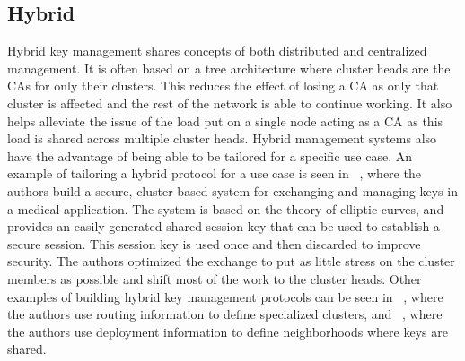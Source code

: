 \documentclass[journal]{IEEEtran}
\begin{document}
\subsection{Hybrid}
Hybrid key management shares concepts of both distributed and centralized management. It is often based on a tree architecture where cluster heads are the CAs for only their clusters. This reduces the effect of losing a CA as only that cluster is affected and the rest of the network is able to continue working. It also helps alleviate the issue of the load put on a single node acting as a CA as this load is shared across multiple cluster heads. Hybrid management systems also have the advantage of being able to be tailored for a specific use case. An example of tailoring a hybrid protocol for a use case is seen in ~\cite{KM2}, where the authors build a secure, cluster-based system for exchanging and managing keys in a medical application. The system is based on the theory of elliptic curves, and provides an easily generated shared session key that can be used to establish a secure session. This session key is used once and then discarded to improve security. The authors optimized the exchange to put as little stress on the cluster members as possible and shift most of the work to the cluster heads. Other examples of building hybrid key management protocols can be seen in ~\cite{KM1}, where the authors use routing information to define specialized clusters, and ~\cite{KM3}, where the authors use deployment information to define neighborhoods where keys are shared.
\end{document}
